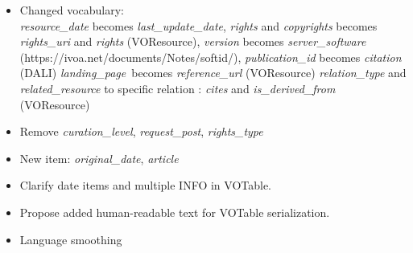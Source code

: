 \documentclass[11pt,a4paper]{ivoa}
\begin{document}
\begin{itemize}
\item Changed vocabulary: \\
  \textit{resource\_date} becomes \textit{last\_update\_date},
  \textit{rights} and \textit{copyrights} becomes \textit{rights\_uri} and \textit{rights} (VOResource),
  \textit{version} becomes \textit{server\_software} (https://ivoa.net/documents/Notes/softid/),
  \textit{publication\_id} becomes \textit{citation} (DALI)
  \textit{landing\_page} becomes \textit{reference\_url} (VOResource)
  \textit{relation\_type} and \textit{related\_resource} to specific relation : \textit{cites} and \textit{is\_derived\_from} (VOResource)
\item Remove \textit{curation\_level},
      \textit{request\_post},
      \textit{rights\_type}
\item New item: \textit{original\_date}, \textit{article}
\item Clarify date items and multiple INFO in VOTable.
\item Propose added human-readable text for VOTable serialization.
\item Language smoothing
\end{itemize}


\end{document}

